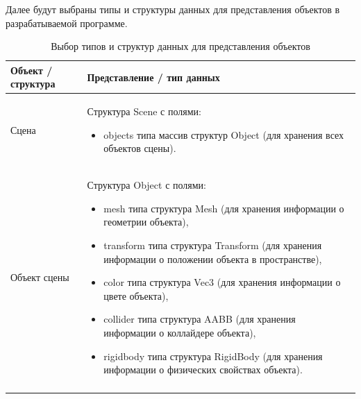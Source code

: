 
Далее будут выбраны типы и структуры данных для представления объектов в разрабатываемой программе.

\noindent
    \begin{longtable}{|p{}|p{}|}
        \caption{Выбор типов и структур данных для представления объектов \label{tab:tds}} \\
        \hline
        Объект / структура
        &
        Представление / тип данных
        \\
        \hline
        Сцена
        &
        Структура Scene с полями:
        \begin{itemize}
            \item objects типа массив структур Object (для хранения всех объектов сцены).
        \end{itemize}
        \\
        \hline
        Объект сцены
        &
        Структура Object с полями:
        \begin{itemize}
            \item mesh типа структура Mesh (для хранения информации о геометрии объекта),
            \item transform типа структура Transform (для хранения информации о положении объекта в пространстве),
            \item color типа структура Vec3 (для хранения информации о цвете объекта),
            \item collider типа структура AABB (для хранения информации о коллайдере объекта),
            \item rigidbody типа структура RigidBody (для хранения информации о физических свойствах объекта).
        \end{itemize}
        \\

        \hline
        \newpage
        \caption{Выбор типов и структур данных для представления объектов} \vspace{0.3cm} \\


\end{longtable}
